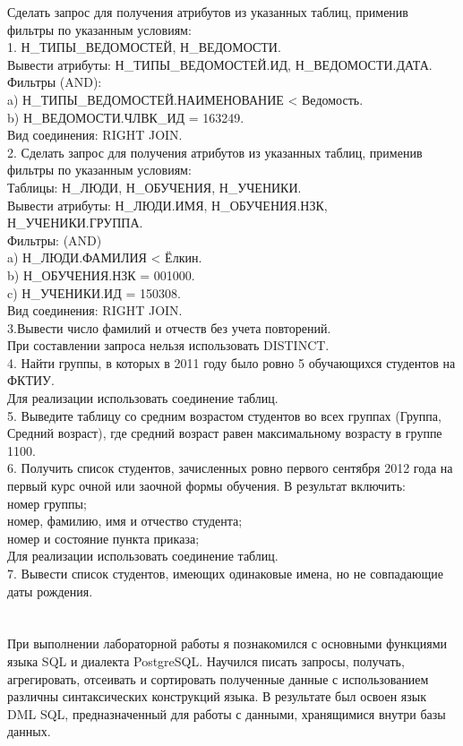 \documentclass[12pt]{article}
\begin{document}
Сделать запрос для получения атрибутов из указанных таблиц, применив фильтры по указанным условиям:\\
1. Н\_ТИПЫ\_ВЕДОМОСТЕЙ, Н\_ВЕДОМОСТИ.\\
Вывести атрибуты: Н\_ТИПЫ\_ВЕДОМОСТЕЙ.ИД, Н\_ВЕДОМОСТИ.ДАТА.\\
Фильтры (AND):\\
a) Н\_ТИПЫ\_ВЕДОМОСТЕЙ.НАИМЕНОВАНИЕ < Ведомость.\\
b) Н\_ВЕДОМОСТИ.ЧЛВК\_ИД = 163249.\\
Вид соединения: RIGHT JOIN.\\
2. Сделать запрос для получения атрибутов из указанных таблиц, применив фильтры по указанным условиям:\\
Таблицы: Н\_ЛЮДИ, Н\_ОБУЧЕНИЯ, Н\_УЧЕНИКИ.\\
Вывести атрибуты: Н\_ЛЮДИ.ИМЯ, Н\_ОБУЧЕНИЯ.НЗК, Н\_УЧЕНИКИ.ГРУППА.\\
Фильтры: (AND)\\
a) Н\_ЛЮДИ.ФАМИЛИЯ < Ёлкин.\\
b) Н\_ОБУЧЕНИЯ.НЗК = 001000.\\
c) Н\_УЧЕНИКИ.ИД = 150308.\\
Вид соединения: RIGHT JOIN.\\
3.Вывести число фамилий и отчеств без учета повторений.\\
При составлении запроса нельзя использовать DISTINCT.\\
4. Найти группы, в которых в 2011 году было ровно 5 обучающихся студентов на ФКТИУ.\\
Для реализации использовать соединение таблиц.\\
5. Выведите таблицу со средним возрастом студентов во всех группах (Группа, Средний возраст), где средний возраст равен максимальному возрасту в группе 1100.\\
6. Получить список студентов, зачисленных ровно первого сентября 2012 года на первый курс очной или заочной формы обучения. В результат включить:\\
номер группы;\\
номер, фамилию, имя и отчество студента;\\
номер и состояние пункта приказа;\\
Для реализации использовать соединение таблиц.\\
7. Вывести список студентов, имеющих одинаковые имена, но не совпадающие даты рождения.\\
\vspace{5mm}
\\


\\
При выполнении лабораторной работы я познакомился с основными функциями языка SQL и диалекта PostgreSQL. Научился писать запросы, получать, агрегировать, отсеивать и сортировать полученные данные с использованием различны синтаксических конструкций языка. В результате был освоен язык DML SQL, предназначенный для работы с данными, хранящимися внутри базы данных.
\end{document}
